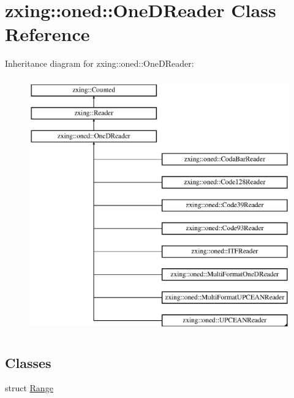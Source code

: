\hypertarget{classzxing_1_1oned_1_1_one_d_reader}{}\section{zxing\+:\+:oned\+:\+:One\+D\+Reader Class Reference}
\label{classzxing_1_1oned_1_1_one_d_reader}
Inheritance diagram for zxing\+:\+:oned\+:\+:One\+D\+Reader\+:\begin{figure}[H]
\begin{center}
\leavevmode
\includegraphics[height=11.000000cm]{classzxing_1_1oned_1_1_one_d_reader}
\end{center}
\end{figure}
\subsection*{Classes}
\begin{DoxyCompactItemize}
\item 
struct \mbox{\hyperlink{structzxing_1_1oned_1_1_one_d_reader_1_1_range}{Range}}
\end{DoxyCompactItemize}
